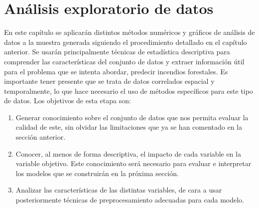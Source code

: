 \documentclass[12pt,a4paper,]{book}
\title{}
\author{Nombre Completo Autor}
\date{18/11/2021}
\def\ifdoblecara{} %
\def\ifprincipal{} %
\let\ifprincipal\undefined %
\numberwithin{dummy}{section}
\theoremstyle{ocrenumbox}
\theoremstyle{blacknumex}
\theoremstyle{blacknumbox}
\theoremstyle{ocrenum}
\theoremstyle{ocrenum}
\begin{document}




\raggedbottom

\ifdefined\ifprincipal
\else
\setlength{\parindent}{1em}
\pagestyle{fancy}
\setcounter{tocdepth}{4}
\tableofcontents

\fi

\ifdefined\ifdoblecara
\fancyhead{}{}
\fancyhead[LE,RO]{\scriptsize\rightmark}
\fancyfoot[LO,RE]{\scriptsize\slshape \leftmark}
\fancyfoot[C]{}
\fancyfoot[LE,RO]{\footnotesize\thepage}
\else
\fancyhead{}{}
\fancyhead[RO]{\scriptsize\rightmark}
\fancyfoot[LO]{\scriptsize\slshape \leftmark}
\fancyfoot[C]{}
\fancyfoot[RO]{\footnotesize\thepage}
\fi

\renewcommand{\headrulewidth}{0.4pt}
\renewcommand{\footrulewidth}{0.4pt}

\hypertarget{anuxe1lisis-exploratorio-de-datos}{%
\chapter{Análisis exploratorio de
datos}\label{anuxe1lisis-exploratorio-de-datos}}

En este capítulo se aplicarán distintos métodos numéricos y gráficos de
análisis de datos a la muestra generada siguiendo el procedimiento
detallado en el capítulo anterior. Se usarán principalmente técnicas de
estadística descriptiva para comprender las características del conjunto
de datos y extraer información útil para el problema que se intenta
abordar, predecir incendios forestales. Es importante tener presente que
se trata de datos correlados espacial y temporalmente, lo que hace
necesario el uso de métodos específicos para este tipo de datos. Los
objetivos de esta etapa son:

\begin{enumerate}
\def\labelenumi{\arabic{enumi}.}
\item
  Generar conocimiento sobre el conjunto de datos que nos permita
  evaluar la calidad de este, sin olvidar las limitaciones que ya se han
  comentado en la sección anterior.
\item
  Conocer, al menos de forma descriptiva, el impacto de cada variable en
  la variable objetivo. Este conocimiento será necesario para evaluar e
  interpretar los modelos que se construirán en la próxima sección.
\item
  Analizar las características de las distintas variables, de cara a
  usar posteriormente técnicas de preprocesamiento adecuadas para cada
  modelo.
\end{enumerate}
\end{document}
